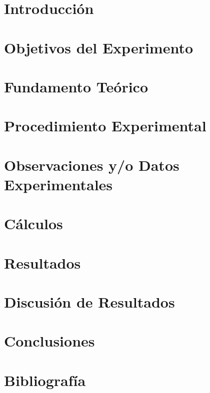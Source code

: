 \documentclass[1in,a4paper]{article}
\begin{document}

\pagestyle{fancy}
\fancyfoot{}
\fancyfoot[R]{\textit{\thepage}}
\tableofcontents
\newpage
\section{Introducción} %


\section{Objetivos del Experimento} %

\section{Fundamento Teórico} %

\section{Procedimiento Experimental} %

\section{Observaciones y/o Datos Experimentales} %

\section{Cálculos} %

\section{Resultados} %

\section{Discusión de Resultados} %

\section{Conclusiones} %

\section{Bibliografía} %
\renewcommand{\bibsection}{}

\newpage
\listoffigures
\listoftables
\end{document}
